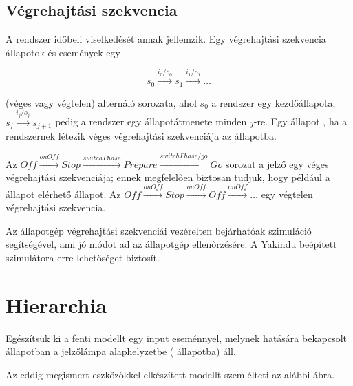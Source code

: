 \subsection{Végrehajtási szekvencia}

A rendszer időbeli viselkedését annak  jellemzik. Egy végrehajtási szekvencia állapotok és események egy

$$s_0 \xrightarrow{i_0 / o_0} s_1 \xrightarrow{i_1 / o_1} \ldots$$

(véges vagy végtelen) alternáló sorozata, ahol $s_0$ a rendszer egy kezdőállapota, $s_j \xrightarrow{i_j / o_j} s_{j+1}$ pedig a rendszer egy állapotátmenete minden $j$-re. Egy állapot , ha a rendszernek létezik véges végrehajtási szekvenciája az állapotba.

\begin{megjegyzes}
	Az $\mathit{Off} \xrightarrow{\mathit{onOff}} \mathit{Stop} \xrightarrow{\mathit{switchPhase}} \mathit{Prepare} \xrightarrow{\mathit{switchPhase} / \mathit{go}} \mathit{Go}$ sorozat a jelző egy véges végrehajtási szekvenciája; ennek megfelelően biztosan tudjuk, hogy például a  állapot elérhető állapot. Az $\mathit{Off} \xrightarrow{\mathit{onOff}} \mathit{Stop} \xrightarrow{\mathit{onOff}} \mathit{Off} \xrightarrow{\mathit{onOff}} \ldots$ egy végtelen végrehajtási szekvencia.
\end{megjegyzes}

Az állapotgép végrehajtási szekvenciái vezérelten bejárhatóak szimuláció segítségével, ami jó módot ad az állapotgép ellenőrzésére. A Yakindu beépített szimulátora erre lehetőséget biztosít.

\section{Hierarchia}

\begin{pelda}
	Egészítsük ki a fenti modellt egy  input eseménnyel, melynek hatására bekapcsolt állapotban a jelzőlámpa alaphelyzetbe ( állapotba) áll.
	
	Az eddig megismert eszközökkel elkészített modellt szemlélteti az alábbi ábra.

\end{pelda}

